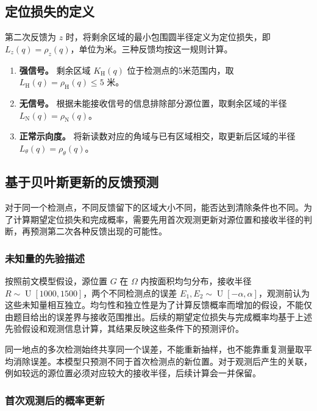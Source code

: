 \documentclass[UTF8,a4paper,zihao=-4,fontset=none]{ctexart}
\begin{document}
\subsection{定位损失的定义}

第二次反馈为 \(z\) 时，将剩余区域的最小包围圆半径定义为定位损失，即 \(L_z(q)=\rho_z(q)\)，单位为米。三种反馈均按这一规则计算。

\begin{enumerate}[label=(\arabic*),leftmargin=2.2em]
  \item \textbf{强信号。} 剩余区域 \(K_{\mathrm H}(q)\) 位于检测点的5米范围内，取 \(L_{\mathrm H}(q)=\rho_{\mathrm H}(q)\le5\) 米。
  \item \textbf{无信号。} 根据未能接收信号的信息排除部分源位置，取剩余区域的半径 \(L_{\mathrm N}(q)=\rho_{\mathrm N}(q)\)。
  \item \textbf{正常示向度。} 将新读数对应的角域与已有区域相交，取更新后区域的半径 \(L_\theta(q)=\rho_\theta(q)\)。
\end{enumerate}

\subsection{基于贝叶斯更新的反馈预测}

对于同一个检测点，不同反馈留下的区域大小不同，能否达到清除条件也不同。为了计算期望定位损失和完成概率，需要先用首次观测更新对源位置和接收半径的判断，再预测第二次各种反馈出现的可能性。

\subsubsection{未知量的先验描述}

按照前文模型假设，源位置 \(G\) 在 \(\Omega\) 内按面积均匀分布，接收半径 \(R\sim\operatorname{U}[1000,1500]\)，两个不同检测点的误差 \(E_1,E_2\sim\operatorname{U}[-\alpha,\alpha]\)，观测前认为这些未知量相互独立。均匀性和独立性是为了计算反馈概率而增加的假设，不能仅由题目给出的误差界与接收范围推出。后续的期望定位损失与完成概率均基于上述先验假设和观测信息计算，其结果反映这些条件下的预测评价。

同一地点的多次检测始终共享同一个误差，不能重新抽样，也不能靠重复测量取平均消除误差。本模型只预测不同于首次检测点的新位置。对于观测后产生的关联，例如较远的源位置必须对应较大的接收半径，后续计算会一并保留。

\subsubsection{首次观测后的概率更新}
\end{document}
